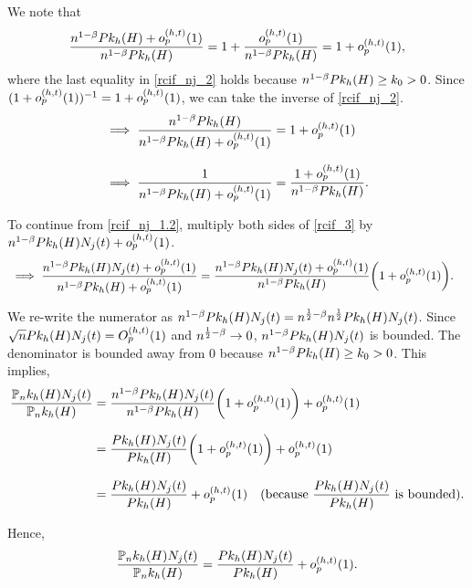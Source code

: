 {We note that
\begin{equation}
\label{rcif_nj_2}
\frac{n^{1-\beta} Pk_h(H) + o_p^{(h, t)}(1)}{n^{1-\beta}Pk_h(H)}
= 1+\frac{o_p^{(h, t)}(1)}{n^{1-\beta}Pk_h(H)}
=1+o_p^{(h, t)}(1),
\end{equation}
where the last equality in \cref{rcif_nj_2} holds because $n^{1-\beta}Pk_h(H) \ge k_0 > 0$.
Since $(1+o_p^{(h, t)}(1))^{-1}=1+o_p^{(h, t)}(1)$, we can take the inverse of \cref{rcif_nj_2}.
\begin{align}
\implies \frac{\tmprateinv\PkH}{\tmprateinv \PkH + \opht} &= 1+\opht \notag \eqnspace
\implies \frac{1}{\tmprateinv \PkH + \opht} &= \frac{1 + \opht}{\tmprateinv \PkH}. \label{rcif_3}
\end{align}

To continue from \cref{rcif_nj_1.2}, multiply both sides of \cref{rcif_3} by $n^{1-\beta} Pk_h(H)N_j(t) + o_p^{(h, t)}(1)$.
\begin{align*}
&\implies \frac{\tmprateinv \PkH\Nj\argt + \opht}{\tmprateinv \PkH + \opht} = \frac{\tmprateinv \PkH\Nj\argt + \opht}{\tmprateinv \PkH} \bigg( 1 + \opht \bigg). %
\end{align*}

We re-write the numerator as $n^{1-\beta}Pk_h(H)N_j(t)=n^{\frac{1}{2}-\beta} n^{\frac{1}{2}}Pk_h(H)N_j(t)$. Since \\ $\sqrt{n}Pk_h(H)N_j(t) = O_p^{(h, t)}(1)$ and $n^{\frac{1}{2}-\beta}\to 0$, $n^{1-\beta}Pk_h(H)N_j(t)$ is bounded. The denominator is bounded away from $0$ because $n^{1-\beta}Pk_h(H) \ge k_0>0$. This implies,
\begin{align*}
\frac{\PnkH\Nj\argt}{\PnkH} &=\frac{\tmprateinv \PkH\Nj\argt}{\tmprateinv \PkH} \bigg( 1 + \opht \bigg) + \opht %
\eqnspace
&=\frac{\PkH\Nj\argt}{\PkH} \bigg( 1 + \opht \bigg) + \opht \notag \eqnspace
&=\frac{\PkH\Nj\argt}{\PkH} + \opht \quad \text{(because $\frac{\PkH\Nj\argt}{\PkH}$ is bounded%
).} 
\end{align*}

Hence, $$\frac{\mathbb{P}_nk_h(H)N_j(t)}{\mathbb{P}_nk_h(H)} = \frac{Pk_h(H)N_j(t)}{Pk_h(H)} + o_p^{(h, t)}(1).$$ %

}
